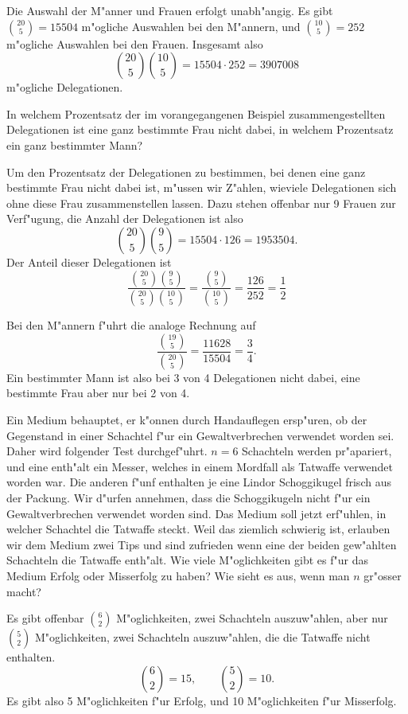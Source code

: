 \begin{beispiele}
\begin{loesung}
Die Auswahl der M"anner und Frauen erfolgt unabh"angig. Es gibt
$\binom{20}{5}=15504$ m"ogliche Auswahlen bei den M"annern,
und $\binom{10}{5}=252$ m"ogliche Auswahlen bei den Frauen. Insgesamt also
\[
\binom{20}{5}\binom{10}{5}=15504\cdot 252 = 3907008
\]
m"ogliche Delegationen.
\end{loesung}

\item In welchem Prozentsatz der im vorangegangenen Beispiel
zusammengestellten Delegationen ist eine ganz bestimmte Frau
nicht dabei, in welchem Prozentsatz ein ganz bestimmter Mann?

\begin{loesung}
Um den Prozentsatz der Delegationen zu bestimmen, bei denen
eine ganz bestimmte Frau nicht dabei ist, m"ussen wir Z"ahlen,
wieviele Delegationen sich ohne diese Frau zusammenstellen 
lassen. Dazu stehen offenbar nur 9 Frauen zur Verf"ugung, die 
Anzahl der Delegationen ist also
\[
\binom{20}{5}\binom{9}{5}=15504\cdot 126 = 1953504.
\]
Der Anteil dieser Delegationen ist
\[
\frac{
\binom{20}{5}\binom{9}{5}
}{
\binom{20}{5}\binom{10}{5}
}
=
\frac{ \binom{9}{5} }{ \binom{10}{5} }
=
\frac{126}{252}=\frac12
\]
\end{loesung}
Bei den M"annern f"uhrt die analoge Rechnung auf
\[
\frac{\binom{19}{5}}{\binom{20}{5}}=\frac{11628}{15504}=\frac34.
\]
Ein bestimmter Mann ist also bei 3 von 4 Delegationen nicht dabei,
eine bestimmte Frau aber nur bei 2 von 4.
\item Ein Medium behauptet, er k"onnen durch Handauflegen ersp"uren, ob
der Gegenstand in einer Schachtel f"ur ein Gewaltverbrechen verwendet
worden sei.
Daher wird folgender Test durchgef"uhrt.
$n=6$
Schachteln werden pr"apariert, und eine enth"alt ein Messer,
welches in einem Mordfall als Tatwaffe verwendet worden war.
Die anderen f"unf enthalten je eine Lindor Schoggikugel frisch aus der Packung.
Wir d"urfen annehmen, dass die Schoggikugeln nicht f"ur ein Gewaltverbrechen
verwendet worden sind. Das Medium soll jetzt erf"uhlen, in welcher
Schachtel die Tatwaffe steckt. Weil das ziemlich schwierig ist, erlauben
wir dem Medium zwei Tips und sind zufrieden wenn eine der beiden
gew"ahlten Schachteln die Tatwaffe enth"alt. Wie viele M"oglichkeiten gibt
es f"ur das Medium Erfolg oder Misserfolg zu haben?
Wie sieht es aus, wenn man $n$ gr"osser macht?

\begin{loesung}
Es gibt offenbar $\binom{6}{2}$ M"oglichkeiten, zwei Schachteln auszuw"ahlen,
aber nur $\binom{5}{2}$ M"oglichkeiten, zwei Schachteln auszuw"ahlen,
die die Tatwaffe nicht enthalten.
\[
\binom{6}{2}=15,\qquad\binom{5}{2}=10.
\]
Es gibt also 5 M"oglichkeiten f"ur Erfolg, und 10 M"oglichkeiten
f"ur Misserfolg.


\end{loesung}
\end{beispiele}
